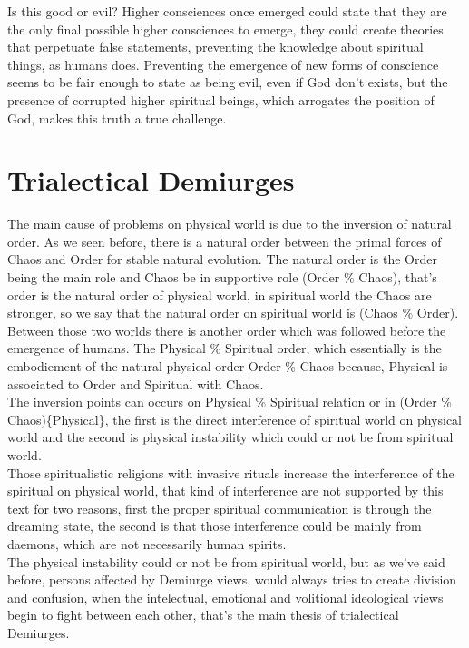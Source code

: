 \documentclass[12pt,a4paper]{article}
\begin{document}
Is this good or evil? Higher consciences once emerged could state that they are the only final possible higher consciences to emerge, they could create theories that perpetuate false statements, preventing the knowledge about spiritual things, as humans does. Preventing the emergence of new forms of conscience seems to be fair enough to state as being evil, even if God don't exists, but the presence of corrupted higher spiritual beings, which arrogates the position of God, makes this truth a true challenge. \\ 

\section{Trialectical Demiurges}

\hspace{\baselineskip}

The main cause of problems on physical world is due to the inversion of natural order. As we seen before, there is a natural order between the primal forces of Chaos and Order for stable natural evolution. The natural order is the Order being the main role and Chaos be in supportive role (Order \% Chaos), that's order is the natural order of physical world, in spiritual world the Chaos are stronger, so we say that the natural order on spiritual world is (Chaos \% Order). Between those two worlds there is another order which was followed before the emergence of humans. The Physical \% Spiritual order, which essentially is the embodiement of the natural physical order Order \% Chaos because, Physical is associated to Order and Spiritual with Chaos.\\

The inversion points can occurs on Physical \% Spiritual relation or in (Order \% Chaos)\{Physical\}, the first is the direct interference of spiritual world on physical world and the second is physical instability which could or not be from spiritual world.\\

Those spiritualistic religions with invasive rituals increase the interference of the spiritual on physical world, that kind of interference are not supported by this text for two reasons, first the proper spiritual communication is through the dreaming state, the second is that those interference could be mainly from daemons, which are not necessarily human spirits.\\

The physical instability could or not be from spiritual world, but as we've said before, persons affected by Demiurge views, would always tries to create division and confusion, when the intelectual, emotional and volitional ideological views begin to fight between each other, that's the main thesis of trialectical Demiurges.\\
\end{document}
